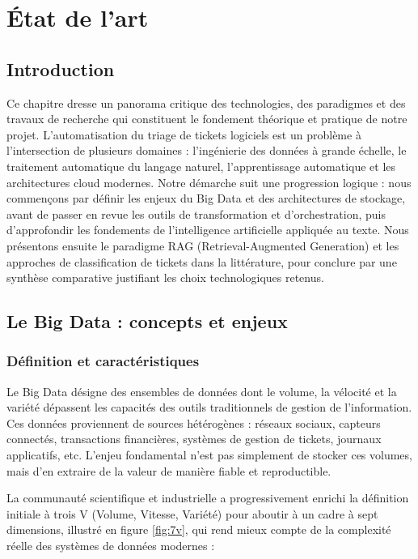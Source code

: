 \chapter{État de l'art}

\lfoot{\leftmark}

\section{Introduction}
Ce chapitre dresse un panorama critique des technologies, des paradigmes et des travaux de recherche qui constituent le fondement théorique et pratique de notre projet. L'automatisation du triage de tickets logiciels est un problème à l'intersection de plusieurs domaines : l'ingénierie des données à grande échelle, le traitement automatique du langage naturel, l'apprentissage automatique et les architectures cloud modernes. Notre démarche suit une progression logique : nous commençons par définir les enjeux du Big Data et des architectures de stockage, avant de passer en revue les outils de transformation et d'orchestration, puis d'approfondir les fondements de l'intelligence artificielle appliquée au texte. Nous présentons ensuite le paradigme RAG (Retrieval-Augmented Generation) et les approches de classification de tickets dans la littérature, pour conclure par une synthèse comparative justifiant les choix technologiques retenus.

\section{Le Big Data : concepts et enjeux}

\subsection{Définition et caractéristiques}

Le Big Data \cite{logo:BG} désigne des ensembles de données dont le volume, la vélocité et la variété dépassent les capacités des outils traditionnels de gestion de l'information. Ces données proviennent de sources hétérogènes : réseaux sociaux, capteurs connectés, transactions financières, systèmes de gestion de tickets, journaux applicatifs, etc. L'enjeu fondamental n'est pas simplement de stocker ces volumes, mais d'en extraire de la valeur de manière fiable et reproductible.

La communauté scientifique et industrielle a progressivement enrichi la définition initiale à trois V (Volume, Vitesse, Variété) pour aboutir à un cadre à sept dimensions, illustré en figure \ref{fig:7v}, qui rend mieux compte de la complexité réelle des systèmes de données modernes \cite{logo:7v} :


